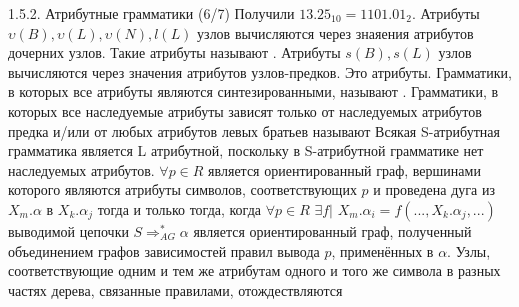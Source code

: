     \begin{frame}{1.5.2. Атрибутные грамматики (6/7)}
        Получили $13.25_{10} = 1101.01_2$. Атрибуты $\upsilon(B), \upsilon(L), \upsilon(N), l(L)$ узлов вычисляются через знаяения атрибутов дочерних узлов. Такие атрибуты называют . Атрибуты $s(B), s(L)$ узлов вычисляются через значения атрибутов узлов-предков. Это  атрибуты.
        Грамматики, в которых все атрибуты являются синтезированными, называют
         .
          Грамматики, в которых все наследуемые атрибуты зависят только от наследуемых атрибутов  предка и/или от любых атрибутов левых братьев называют 
        \remark Всякая S-атрибутная грамматика является L атрибутной, поскольку в  
        S-атрибутной грамматике нет наследуемых атрибутов.
         $\forall p \in R$ является ориентированный граф, вершинами которого являются атрибуты символов, соответствующих $p$ и проведена дуга из $X_m.\alpha$ в $X_k.\alpha_j$ тогда и только тогда, когда $\forall p \in R$ $\exists f | $  $X_m.\alpha_i = f(...,X_k.\alpha_j,...)$
             выводимой цепочки $S\Rightarrow^*_{AG} \alpha$ является ориентированный граф, полученный объединением графов зависимостей правил вывода $p$, применённых в $\alpha$. Узлы, соответствующие одним и тем же атрибутам одного и того же символа в разных частях дерева, связанные правилами, отождествляются
    \end{frame}



